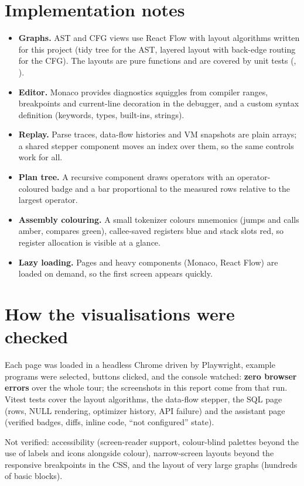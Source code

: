 \section{Implementation notes}
\begin{itemize}
  \item \textbf{Graphs.} AST and CFG views use React Flow with layout algorithms written for this project (tidy tree for the AST, layered layout with back-edge routing for the CFG). The layouts are pure functions and are covered by unit tests (, ).
  \item \textbf{Editor.} Monaco provides diagnostics squiggles from compiler ranges, breakpoints and current-line decoration in the debugger, and a custom \nova{} syntax definition (keywords, types, built-ins, strings).
  \item \textbf{Replay.} Parse traces, data-flow histories and VM snapshots are plain arrays; a shared stepper component moves an index over them, so the same controls work for all.
  \item \textbf{Plan tree.} A recursive component draws operators with an operator-coloured badge and a bar proportional to the measured rows relative to the largest operator.
  \item \textbf{Assembly colouring.} A small tokenizer colours mnemonics (jumps and calls amber, compares green), callee-saved registers blue and stack slots red, so register allocation is visible at a glance.
  \item \textbf{Lazy loading.} Pages and heavy components (Monaco, React Flow) are loaded on demand, so the first screen appears quickly.
\end{itemize}

\section{How the visualisations were checked}
Each page was loaded in a headless Chrome driven by Playwright, example programs were selected, buttons clicked, and the console watched: \textbf{zero browser errors} over the whole tour; the screenshots in this report come from that run. Vitest tests cover the layout algorithms, the data-flow stepper, the SQL page (rows, NULL rendering, optimizer history, API failure) and the assistant page (verified badges, diffs, inline code, ``not configured'' state).

\begin{warnbox}
Not verified: accessibility (screen-reader support, colour-blind palettes beyond the use of labels and icons alongside colour), narrow-screen layouts beyond the responsive breakpoints in the CSS, and the layout of very large graphs (hundreds of basic blocks).
\end{warnbox}

